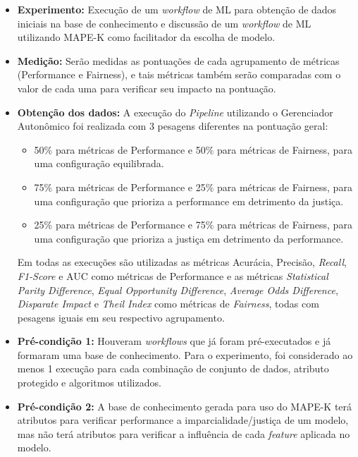\documentclass[portugues]{ic-tese}
\begin{document}
\begin{itemize}
\item \textbf{Experimento:} Execução de um \textit{workflow} de ML para obtenção de dados iniciais na base de conhecimento e discussão de um \textit{workflow} de ML utilizando MAPE-K como facilitador da escolha de modelo.

\item \textbf{Medição:} Serão medidas as pontuações de cada agrupamento de métricas (Performance e Fairness), e tais métricas também serão comparadas com o valor de cada uma para verificar seu impacto na pontuação.

\item \textbf{Obtenção dos dados:} A execução do \textit{Pipeline} utilizando o Gerenciador Autonômico foi realizada com 3 pesagens diferentes na pontuação geral:

\begin{itemize}
\item 50\% para métricas de Performance e 50\% para métricas de Fairness, para uma configuração equilibrada.
\item 75\% para métricas de Performance e 25\% para métricas de Fairness, para uma configuração que prioriza a performance em detrimento da justiça.
\item 25\% para métricas de Performance e 75\% para métricas de Fairness, para uma configuração que prioriza a justiça em detrimento da performance.
\end{itemize}

Em todas as execuções são utilizadas as métricas Acurácia, Precisão, \textit{Recall}, \textit{F1-Score} e AUC como métricas de Performance e as métricas \textit{Statistical Parity Difference}, \textit{Equal Opportunity Difference}, \textit{Average Odds Difference}, \textit{Disparate Impact} e \textit{Theil Index} como métricas de \textit{Fairness}, todas com pesagens iguais em seu respectivo agrupamento.

\item \textbf{Pré-condição 1:} Houveram \textit{workflows} que já foram pré-executados e já formaram uma base de conhecimento. Para o experimento, foi considerado ao menos 1 execução para cada combinação de conjunto de dados, atributo protegido e algoritmos utilizados.

\item \textbf{Pré-condição 2:} A base de conhecimento gerada para uso do MAPE-K terá atributos para verificar performance a imparcialidade/justiça de um modelo, mas não terá atributos para verificar a influência de cada \textit{feature} aplicada no modelo.


\end{itemize}
\end{document}
